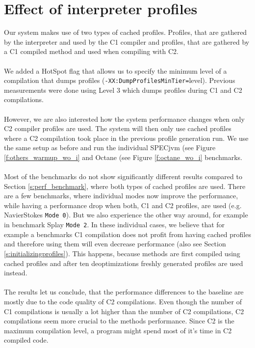 \section{Effect of interpreter profiles}
\label{s:perf_interpreter_profiles}
Our system makes use of two types of cached profiles. Profiles, that are gathered by the interpreter and used by the C1 compiler and profiles, that are gathered by a C1 compiled method and used when compiling with C2.
\\\\
We added a HotSpot flag that allows us to specify the minimum level of a compilation that dumps profiles (\texttt{-XX:DumpProfilesMinTier=}level).
Previous measurements were done using Level 3 which dumps profiles during C1 and C2 compilations.
\\\\
However, we are also interested how the system performance changes when only C2 compiler profiles are used. The system will then only use cached profiles where a C2 compilation took place in the previous profile generation run. We use the same setup as before and run the individual SPECjvm (see Figure \ref{f:others_warmup_wo_i} and Octane (see Figure \ref{f:octane_wo_i} benchmarks. 
\\\\
Most of the benchmarks do not show significantly different results compared to Section \ref{s:perf_benchmark}, where both types of cached profiles are used. There are a few benchmarks, where individual modes now improve the performance, while having a performance drop when both, C1 and C2 profiles, are used (e.g. NavierStokes \texttt{Mode 0}). But we also experience the other way around, for example in benchmark Splay \texttt{Mode 2}. In these individual cases, we believe that for example a benchmarks C1 compilation does not profit from having cached profiles and therefore using them will even decrease performance (also see Section \ref{s:initializingprofiles}). This happens, because methods are first compiled using cached profiles and after ten deoptimizations freshly generated profiles are used instead.
\\\\
The results let us conclude, that the performance differences to the baseline are mostly due to the code quality of C2 compilations. Even though the number of C1 compilations is usually a lot higher than the number of C2 compilations, C2 compilations seem more crucial to the methods performance.
Since C2 is the maximum compilation level, a program might spend most of it's time in C2 compiled code.
